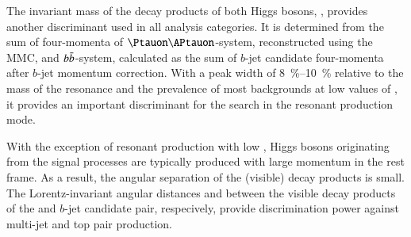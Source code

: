 The invariant mass of the decay products of both Higgs bosons, \mHH,
provides another discriminant used in all analysis categories. It is
determined from the sum of four-momenta of $\Ptauon\APtauon$-system,
reconstructed using the MMC, and $b\bar{b}$-system, calculated as the
sum of $b$-jet candidate four-momenta after $b$-jet momentum
correction. With a peak width of \SIrange{8}{10}{\percent} relative to
the mass of the resonance and the prevalence of most backgrounds at
low values of \mHH, it provides an important discriminant for the
search in the resonant production mode.

With the exception of resonant production with low \mX, Higgs bosons
originating from the signal processes are typically produced with
large momentum in the \HH rest frame. As a result, the angular
separation of the (visible) \PHiggs decay products is small. The
Lorentz-invariant angular distances \dRtautau and \dRbb between the
visible decay products of the \taulepton and $b$-jet candidate pair,
respecively, provide discrimination power against multi-jet and top
pair production. %

